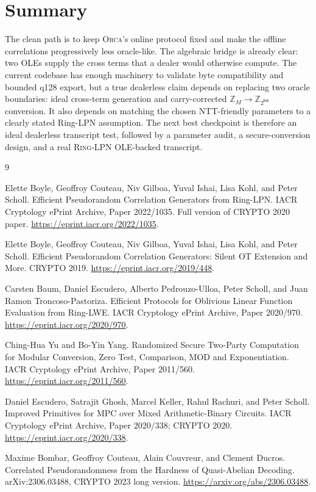 \documentclass[11pt]{article}
\newcommand{\Z}{\mathbb{Z}}
\newcommand{\modtwo}{\Z_{2^{\mathsf{bw}}}}
\newcommand{\Orca}{\textsc{Orca}}
\newcommand{\RingLPN}{\textsc{Ring-LPN}}
\begin{document}
\section{Summary}

The clean path is to keep \Orca{}'s online protocol fixed and make the offline
correlations progressively less oracle-like. The algebraic bridge is already
clear: two OLEs supply the cross terms that a dealer would otherwise compute.
The current codebase has enough machinery to validate byte compatibility and
bounded q128 export, but a true dealerless claim depends on replacing two
oracle boundaries: ideal cross-term generation and carry-corrected
\(\Z_M \rightarrow \modtwo\) conversion. It also depends on matching the
chosen NTT-friendly parameters to a clearly stated Ring-LPN assumption. The
next best checkpoint is therefore an ideal dealerless transcript test,
followed by a parameter audit, a secure-conversion design, and a real
\RingLPN{} OLE-backed transcript.

\begin{thebibliography}{9}

Elette Boyle, Geoffroy Couteau, Niv Gilboa, Yuval Ishai, Lisa Kohl, and
Peter Scholl.
\newblock Efficient Pseudorandom Correlation Generators from Ring-LPN.
\newblock IACR Cryptology ePrint Archive, Paper 2022/1035. Full version of
CRYPTO 2020 paper.
\newblock \url{https://eprint.iacr.org/2022/1035}.

Elette Boyle, Geoffroy Couteau, Niv Gilboa, Yuval Ishai, Lisa Kohl, and
Peter Scholl.
\newblock Efficient Pseudorandom Correlation Generators: Silent OT Extension
and More.
\newblock CRYPTO 2019.
\newblock \url{https://eprint.iacr.org/2019/448}.

Carsten Baum, Daniel Escudero, Alberto Pedrouzo-Ulloa, Peter Scholl, and
Juan Ramon Troncoso-Pastoriza.
\newblock Efficient Protocols for Oblivious Linear Function Evaluation from
Ring-LWE.
\newblock IACR Cryptology ePrint Archive, Paper 2020/970.
\newblock \url{https://eprint.iacr.org/2020/970}.

Ching-Hua Yu and Bo-Yin Yang.
\newblock Randomized Secure Two-Party Computation for Modular Conversion, Zero
Test, Comparison, MOD and Exponentiation.
\newblock IACR Cryptology ePrint Archive, Paper 2011/560.
\newblock \url{https://eprint.iacr.org/2011/560}.

Daniel Escudero, Satrajit Ghosh, Marcel Keller, Rahul Rachuri, and Peter
Scholl.
\newblock Improved Primitives for MPC over Mixed Arithmetic-Binary Circuits.
\newblock IACR Cryptology ePrint Archive, Paper 2020/338; CRYPTO 2020.
\newblock \url{https://eprint.iacr.org/2020/338}.

Maxime Bombar, Geoffroy Couteau, Alain Couvreur, and Clement Ducros.
\newblock Correlated Pseudorandomness from the Hardness of Quasi-Abelian
Decoding.
\newblock arXiv:2306.03488, CRYPTO 2023 long version.
\newblock \url{https://arxiv.org/abs/2306.03488}.

\end{thebibliography}
\end{document}
